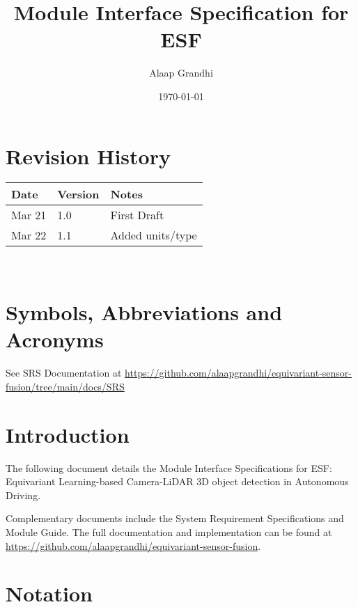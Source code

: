 \documentclass[12pt, titlepage]{article}
\newcommand{\ProjectName}{ESF}
\begin{document}
\title{Module Interface Specification for \ProjectName{}}

\author{Alaap Grandhi}

\date{\today}

\maketitle


\section{Revision History}

\begin{tabularx}{\textwidth}{p{3cm}p{2cm}X}
\toprule {\bf Date} & {\bf Version} & {\bf Notes}\\
\midrule
Mar 21 & 1.0 & First Draft\\
Mar 22 & 1.1 & Added units/type\\
\bottomrule
\end{tabularx}

~\newpage

\section{Symbols, Abbreviations and Acronyms}

See SRS Documentation at \url{https://github.com/alaapgrandhi/equivariant-sensor-fusion/tree/main/docs/SRS}

\newpage

\tableofcontents

\newpage


\section{Introduction}

The following document details the Module Interface Specifications for
\ProjectName: Equivariant Learning-based Camera-LiDAR 3D object detection in Autonomous Driving.

Complementary documents include the System Requirement Specifications
and Module Guide.  The full documentation and implementation can be
found at \url{https://github.com/alaapgrandhi/equivariant-sensor-fusion}.

\section{Notation}
\end{document}

